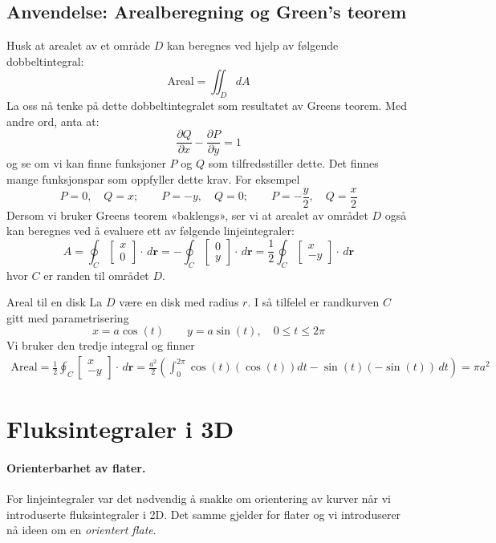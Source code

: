 %
\subsection{Anvendelse: Arealberegning og Green's teorem}
Husk at arealet av et område \( D \) kan beregnes ved hjelp av følgende dobbeltintegral:
\[
\text{Areal} = \iint_D dA
\]
La oss nå tenke på dette dobbeltintegralet som resultatet av Greens teorem. Med andre ord, anta at:
\[
\frac{\partial Q}{\partial x} - \frac{\partial P}{\partial y} = 1
\]
og se om vi kan finne funksjoner \( P \) og \( Q \) som tilfredsstiller dette.
Det finnes mange funksjonspar som oppfyller dette krav. For eksempel
\[
P = 0,\quad Q = x; \qquad 
P = -y,\quad Q = 0;
\qquad 
P = -\frac{y}{2},\quad Q = \frac{x}{2}
\]
Dersom vi bruker Greens teorem «baklengs», ser vi at arealet av området \( D \) også kan beregnes ved å evaluere ett av følgende linjeintegraler:
\[
A = \oint_C \begin{bmatrix} x\\ 0\end{bmatrix} \cdot \, d\mathbf{r} = -\oint_C\begin{bmatrix} 0\\ y\end{bmatrix} \cdot \, d\mathbf{r} = \frac{1}{2} \oint_C \begin{bmatrix} x\\ -y\end{bmatrix} \cdot \, d\mathbf{r}
\]
hvor \( C \) er randen til området \( D \).
\begin{eks}{Areal til en disk}
La $D$ være en disk med radius $r$. I så tilfelel er randkurven $C$ gitt med parametrisering
\[x=a\cos (t) \qquad y= a \sin(t), \quad 0\leq t \leq 2\pi \]
Vi bruker den tredje integral og finner
\begin{align*}
\text{Areal} = \frac{1}{2}\oint_C\begin{bmatrix} x\\-y\end{bmatrix} \cdot \, d\mathbf{r} = \frac{a^2}{2}\left(\int_0^{2\pi} \cos (t) (\cos(t)) dt - \sin(t) (-\sin(t)) \, dt \right) = \pi a^2
\end{align*}
\end{eks}

%
%
%
\section{Fluksintegraler i 3D}

\paragraph{Orienterbarhet av flater. }For linjeintegraler var det nødvendig å snakke om orientering av kurver når vi introduserte fluksintegraler i 2D. Det samme gjelder for flater og vi introduserer nå ideen om en \emph{orientert flate}.

